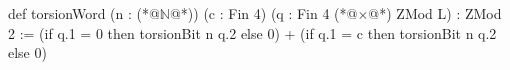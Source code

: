 def torsionWord (n : (*@$\mathbb N$@*)) (c : Fin 4) (q : Fin 4 (*@$\times$@*) ZMod L) : ZMod 2 :=
  (if q.1 = 0 then torsionBit n q.2 else 0) +
  (if q.1 = c then torsionBit n q.2 else 0)
